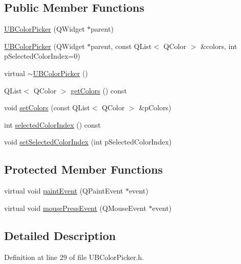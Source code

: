 \subsection*{Public Member Functions}
\begin{DoxyCompactItemize}
\item 
\hyperlink{class_u_b_color_picker_a2dbc9471827225551cb646c1e3b6766f}{U\-B\-Color\-Picker} (Q\-Widget $\ast$parent)
\item 
\hyperlink{class_u_b_color_picker_ad55b2adab4059a843b252d0e7b42c5fc}{U\-B\-Color\-Picker} (Q\-Widget $\ast$parent, const Q\-List$<$ Q\-Color $>$ \&colors, int p\-Selected\-Color\-Index=0)
\item 
virtual \hyperlink{class_u_b_color_picker_a8cd49b5b5c69ccf267d7d26b284b2578}{$\sim$\-U\-B\-Color\-Picker} ()
\item 
Q\-List$<$ Q\-Color $>$ \hyperlink{class_u_b_color_picker_ae88342f0bb98503c9ad938b88a319055}{get\-Colors} () const 
\item 
void \hyperlink{class_u_b_color_picker_a112608c405a7655254d93b9c3b7abb5f}{set\-Colors} (const Q\-List$<$ Q\-Color $>$ \&p\-Colors)
\item 
int \hyperlink{class_u_b_color_picker_a5560d59068afd319dea43329a6bf4f0c}{selected\-Color\-Index} () const 
\item 
void \hyperlink{class_u_b_color_picker_a3bad5c8fed65dd4811a0034a0cd36956}{set\-Selected\-Color\-Index} (int p\-Selected\-Color\-Index)
\end{DoxyCompactItemize}
\subsection*{Protected Member Functions}
\begin{DoxyCompactItemize}
\item 
virtual void \hyperlink{class_u_b_color_picker_ae6d1f461011861c1f9ce2d35040026aa}{paint\-Event} (Q\-Paint\-Event $\ast$event)
\item 
virtual void \hyperlink{class_u_b_color_picker_afcafdc6bdca8156205047a8531fc14c7}{mouse\-Press\-Event} (Q\-Mouse\-Event $\ast$event)
\end{DoxyCompactItemize}


\subsection{Detailed Description}


Definition at line 29 of file U\-B\-Color\-Picker.\-h.




